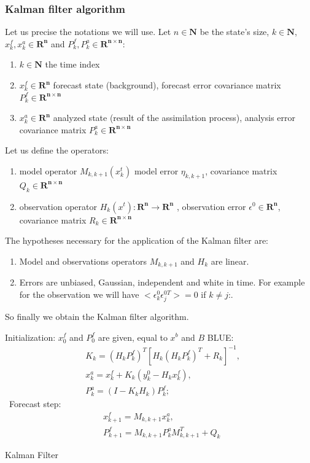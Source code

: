 \subsubsection{Kalman filter algorithm}
Let us precise the notations we will use.
\newline
\noindent Let $n\in \mathbf{N}$ be the state's size, $k\in \mathbf{N}$, $x_k^f ,x_k^a\in \mathbf{R^n}$ and $P_k^f,P_k^a \in \mathbf{R^{n\times n}}$:
 \begin{enumerate}[label=\textbullet]
		\item $k\in \mathbf{N} $ the time index
		\item $x_{k}^{f}\in \mathbf{R^n}$ forecast state (background), forecast error covariance matrix $P_{k}^{f}\in \mathbf{R^{n\times n}}$
		\item $x_{k}^{a}\in \mathbf{R^n}$ analyzed state (result of the assimilation process), analysis error covariance matrix $P_{k}^{a}\in \mathbf{R^{n\times n}}$
	\end{enumerate}
\noindent Let us define the operators:
    \begin{enumerate}[label=\textbullet]
		\item model operator $ M_{k,k+1}(x_{k}^{t}) $ model error $\eta
		_{k,k+1}$, covariance matrix $Q_k\in \mathbf{R^{n\times n}}$
		\item observation operator $ H_k (x^t ): \mathbf{R^n} \rightarrow \mathbf{R^n} $ , observation error $\epsilon^0\in \mathbf{R^n}$, covariance matrix $R_k\in \mathbf{R^{n\times n}}$
	\end{enumerate}
\noindent The hypotheses necessary for the application of the Kalman filter are:
    \begin{enumerate}[label=\textbullet]
		\item Model and observations operators $M_{k,k+1}$ and $H_k$ are linear.
		\item Errors are unbiased, Gaussian, independent and white in time. For example for the observation we will have $<\epsilon_k^0\epsilon_j^{0T}>=0$ if $k\ne j$:.
	\end{enumerate}
So finally we obtain the Kalman filter algorithm.
\IncMargin{1em}
\begin{algorithm}

\BlankLine
Initialization: $x_0^f$ and $P_0^f$ are given, equal to $x^b$ and $B$\;
BLUE:
$$\begin{aligned} &K_k=(H_kP_k^f)^T[H_k(H_kP_k^f)^T+R_k]^{-1}, \\
&x_k^a=x_k^f+K_k(y_k^0-H_kx_k^f), \\
&P_k^a=(I-K_kH_k)P_k^f;
\end{aligned}$$\
Forecast step:
$$\begin{aligned} 
&x_{k+1}^f=M_{k,k+1}x_k^a, \\
&P_{k+1}^f=M_{k,k+1}P_k^aM_{k,k+1}^T+Q_k\;
\end{aligned}$$
\caption{Kalman Filter}\label{enkf}
\end{algorithm}


